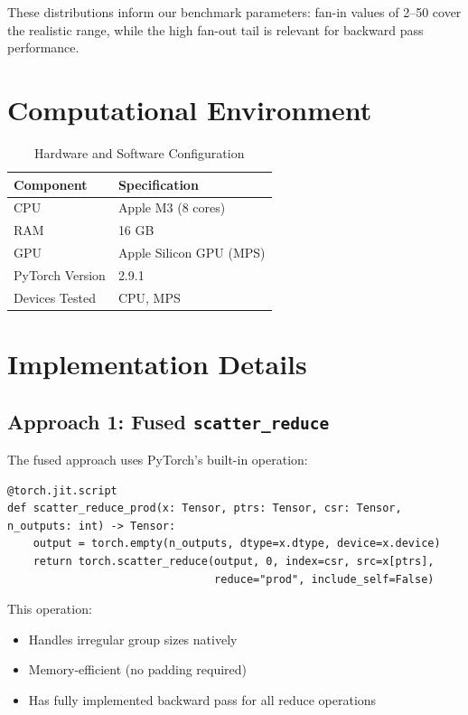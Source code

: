 \documentclass[11pt]{article}
\begin{document}
These distributions inform our benchmark parameters: fan-in values of 2--50 cover the realistic range, while the high fan-out tail is relevant for backward pass performance.

\section{Computational Environment}

\begin{table}[H]
\centering
\caption{Hardware and Software Configuration}
\begin{tabular}{@{}ll@{}}
\toprule
\textbf{Component} & \textbf{Specification} \\
\midrule
CPU & Apple M3 (8 cores) \\
RAM & 16 GB \\
GPU & Apple Silicon GPU (MPS) \\
PyTorch Version & 2.9.1 \\
Devices Tested & CPU, MPS \\
\bottomrule
\end{tabular}
\end{table}

\section{Implementation Details}

\subsection{Approach 1: Fused \texttt{scatter\_reduce}}

The fused approach uses PyTorch's built-in operation:

\begin{lstlisting}
@torch.jit.script
def scatter_reduce_prod(x: Tensor, ptrs: Tensor, csr: Tensor, n_outputs: int) -> Tensor:
    output = torch.empty(n_outputs, dtype=x.dtype, device=x.device)
    return torch.scatter_reduce(output, 0, index=csr, src=x[ptrs], 
                                reduce="prod", include_self=False)
\end{lstlisting}

This operation:
\begin{itemize}
    \item Handles irregular group sizes natively
    \item Memory-efficient (no padding required)
    \item Has fully implemented backward pass for all reduce operations
\end{itemize}
\end{document}

